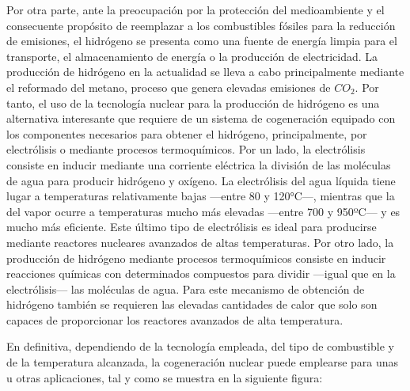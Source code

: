 Por otra parte, ante la preocupación por la protección del medioambiente y el consecuente propósito de reemplazar a los combustibles fósiles para la reducción de emisiones, el hidrógeno se presenta como una fuente de energía limpia para el transporte, el almacenamiento de energía o la producción de electricidad. La producción de hidrógeno en la actualidad se lleva a cabo principalmente mediante el reformado del metano, proceso que genera elevadas emisiones de $CO_2$. Por tanto, el uso de la tecnología nuclear para la producción de hidrógeno es una alternativa interesante que requiere de un sistema de cogeneración equipado con los componentes necesarios para obtener el hidrógeno, principalmente, por electrólisis o mediante procesos termoquímicos. Por un lado, la electrólisis consiste en inducir mediante una corriente eléctrica la división de las moléculas de agua para producir hidrógeno y oxígeno. La electrólisis del agua líquida tiene lugar a temperaturas relativamente bajas ---entre 80 y 120°C---, mientras que la del vapor ocurre a temperaturas mucho más elevadas ---entre 700 y 950ºC--- y es mucho más eficiente. Este último tipo de electrólisis es ideal para producirse mediante reactores nucleares avanzados de altas temperaturas. Por otro lado, la producción de hidrógeno mediante procesos termoquímicos consiste en inducir reacciones químicas con determinados compuestos para dividir ---igual que en la electrólisis--- las moléculas de agua. Para este mecanismo de obtención de hidrógeno también se requieren las elevadas cantidades de calor que solo son capaces de proporcionar los reactores avanzados de alta temperatura.

En definitiva, dependiendo de la tecnología empleada, del tipo de combustible y de la temperatura alcanzada, la cogeneración nuclear puede emplearse para unas u otras aplicaciones, tal y como se muestra en la siguiente figura:

